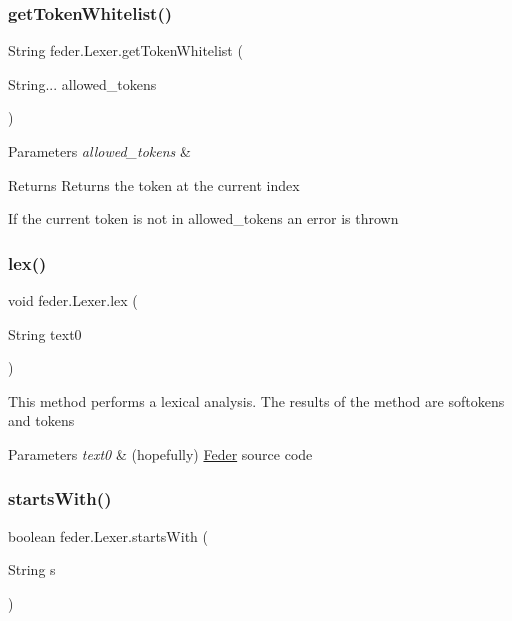 \subsubsection{\texorpdfstring{get\+Token\+Whitelist()}{getTokenWhitelist()}\hspace{0.1cm}{\footnotesize\ttfamily [2/2]}}
{\footnotesize\ttfamily String feder.\+Lexer.\+get\+Token\+Whitelist (\begin{DoxyParamCaption}\item[{String...}]{allowed\+\_\+tokens }\end{DoxyParamCaption})}


\begin{DoxyParams}{Parameters}
{\em allowed\+\_\+tokens} & \\
\hline
\end{DoxyParams}
\begin{DoxyReturn}{Returns}
Returns the token at the current index
\end{DoxyReturn}
If the current token is not in allowed\+\_\+tokens an error is thrown \mbox{\label{classfeder_1_1Lexer_a69679a02624d16be3b567fd2aa71be57}} 
\subsubsection{\texorpdfstring{lex()}{lex()}}
{\footnotesize\ttfamily void feder.\+Lexer.\+lex (\begin{DoxyParamCaption}\item[{String}]{text0 }\end{DoxyParamCaption})}

This method performs a lexical analysis. The results of the method are softokens and tokens


\begin{DoxyParams}{Parameters}
{\em text0} & (hopefully) \hyperlink{classfeder_1_1Feder}{Feder} source code \\
\hline
\end{DoxyParams}
\mbox{\label{classfeder_1_1Lexer_aebe48a23dda741c897806ab3413f711f}} 
\subsubsection{\texorpdfstring{starts\+With()}{startsWith()}}
{\footnotesize\ttfamily boolean feder.\+Lexer.\+starts\+With (\begin{DoxyParamCaption}\item[{String}]{s }\end{DoxyParamCaption})}

